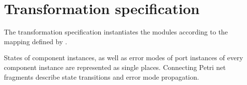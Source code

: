 \section{Transformation specification}

The transformation specification instantiates the  modules according to the mapping defined by \citet[Chapter~6]{Ecsedi16architecture}.

States of component instances, as well as error modes of port instances of every component instance are represented as single places. Connecting Petri net fragments describe state transitions and error mode propagation.

